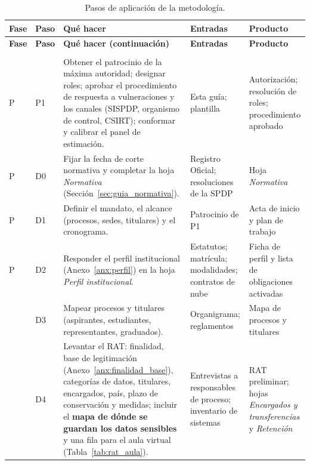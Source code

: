 {\scriptsize
\renewcommand{\arraystretch}{1.15}
\begin{xltabular}{\textwidth}{|>{\raggedright\arraybackslash}p{0.7cm}|>{\raggedright\arraybackslash}p{0.8cm}|L|>{\raggedright\arraybackslash}p{2.5cm}|>{\raggedright\arraybackslash}p{2.6cm}|}
  \caption{Pasos de aplicación de la metodología.}
  \label{tab:guia_pasos} \\
  \hline
  \textbf{Fase} & \textbf{Paso} & \textbf{Qué hacer} & \textbf{Entradas} & \textbf{Producto} \\
  \hline
  \endfirsthead
  \hline
  \textbf{Fase} & \textbf{Paso} & \textbf{Qué hacer (continuación)} & \textbf{Entradas} & \textbf{Producto} \\
  \hline
  \endhead
  \hline
   \\
  \endfoot
  \hline
  \endlastfoot
  P & P1 & Obtener el patrocinio de la máxima autoridad; designar roles; aprobar el procedimiento de respuesta a vulneraciones y los canales (SISPDP, organismo de control, CSIRT); conformar y calibrar el panel de estimación. & Esta guía; plantilla & Autorización; resolución de roles; procedimiento aprobado \\ \hline
  P & D0 & Fijar la fecha de corte normativa y completar la hoja \textit{Normativa} (Sección~\ref{sec:guia_normativa}). & Registro Oficial; resoluciones de la SPDP & Hoja \textit{Normativa} \\ \hline
  P & D1 & Definir el mandato, el alcance (procesos, sedes, titulares) y el cronograma. & Patrocinio de P1 & Acta de inicio y plan de trabajo \\ \hline
  P & D2 & Responder el perfil institucional (Anexo~\ref{anx:perfil}) en la hoja \textit{Perfil institucional}. & Estatutos; matrícula; modalidades; contratos de nube & Ficha de perfil y lista de obligaciones activadas \\  & D3 & Mapear procesos y titulares (aspirantes, estudiantes, representantes, graduados). & Organigrama; reglamentos & Mapa de procesos y titulares \\  & D4 & Levantar el RAT: finalidad, base de legitimación (Anexo~\ref{anx:finalidad_base}), categorías de datos, titulares, encargados, país, plazo de conservación y medidas; incluir el \textbf{mapa de dónde se guardan los datos sensibles} y una fila para el aula virtual (Tabla~\ref{tab:rat_aula}). & Entrevistas a responsables de proceso; inventario de sistemas & RAT preliminar; hojas \textit{Encargados y transferencias} y \textit{Retención} \\ \hline

\end{xltabular}}

